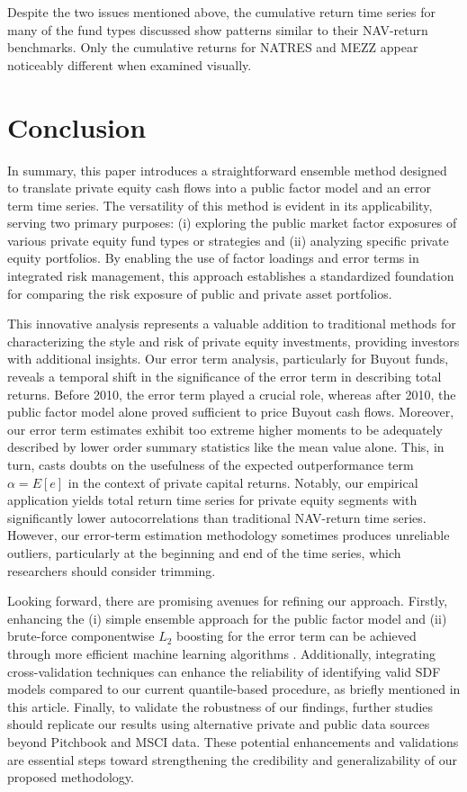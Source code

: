 \documentclass[12pt]{article}
\begin{document}
Despite the two issues mentioned above, the cumulative return time series for many of the fund types discussed show patterns similar to their NAV-return benchmarks. 
Only the cumulative returns for NATRES and MEZZ appear noticeably different when examined visually.

\section{Conclusion}
\label{sec:conclusion}

In summary, this paper introduces a straightforward ensemble method designed to translate private equity cash flows into a public factor model and an error term time series. 
The versatility of this method is evident in its applicability, serving two primary purposes: 
(i) exploring the public market factor exposures of various private equity fund types or strategies and (ii) analyzing specific private equity portfolios. 
By enabling the use of factor loadings and error terms in integrated risk management, this approach establishes a standardized foundation for comparing the risk exposure of public and private asset portfolios.

This innovative analysis represents a valuable addition to traditional methods for characterizing the style and risk of private equity investments, providing investors with additional insights. 
Our error term analysis, particularly for Buyout funds, reveals a temporal shift in the significance of the error term in describing total returns. 
Before 2010, the error term played a crucial role, whereas after 2010, the public factor model alone proved sufficient to price Buyout cash flows. 
Moreover, our error term estimates exhibit too extreme higher moments to be adequately  described by lower order summary statistics like the mean value alone.
This, in turn, casts doubts on the usefulness of the expected outperformance term $\alpha = E [ e ]$ in the context of private capital returns.
Notably, our empirical application yields total return time series for private equity segments with significantly lower autocorrelations than traditional NAV-return time series.
However, our error-term estimation methodology sometimes produces unreliable outliers, particularly at the beginning and end of the time series, which researchers should consider trimming.

Looking forward, there are promising avenues for refining our approach. 
Firstly, enhancing the (i) simple ensemble approach for the public factor model and (ii) brute-force componentwise $L_2$ boosting for the error term can be achieved through more efficient machine learning algorithms \citep{B12}.
Additionally, integrating cross-validation techniques can enhance the reliability of identifying valid SDF models compared to our current quantile-based procedure, as briefly mentioned in this article.
Finally, to validate the robustness of our findings, further studies should replicate our results using alternative private and public data sources beyond Pitchbook and MSCI data. 
These potential enhancements and validations are essential steps toward strengthening the credibility and generalizability of our proposed methodology.




\appendix



\end{document}
